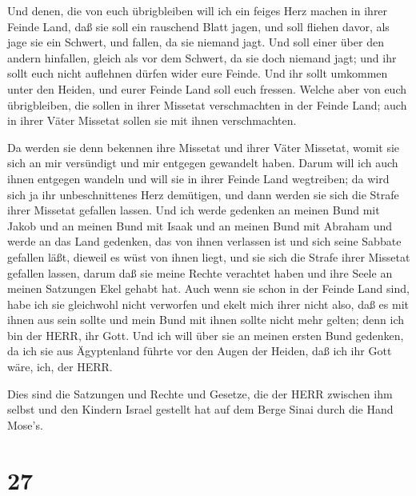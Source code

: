  Und denen, die von euch übrigbleiben will ich ein feiges
Herz machen in ihrer Feinde Land, daß sie soll ein rauschend Blatt
jagen, und soll fliehen davor, als jage sie ein Schwert, und fallen, da
sie niemand jagt.  Und soll einer über den andern
hinfallen, gleich als vor dem Schwert, da sie doch niemand jagt; und ihr
sollt euch nicht auflehnen dürfen wider eure Feinde.  Und
ihr sollt umkommen unter den Heiden, und eurer Feinde Land soll euch
fressen.  Welche aber von euch übrigbleiben, die sollen in
ihrer Missetat verschmachten in der Feinde Land; auch in ihrer Väter
Missetat sollen sie mit ihnen verschmachten.

 Da werden sie denn bekennen ihre Missetat und ihrer Väter
Missetat, womit sie sich an mir versündigt und mir entgegen gewandelt
haben.  Darum will ich auch ihnen entgegen wandeln und will
sie in ihrer Feinde Land wegtreiben; da wird sich ja ihr unbeschnittenes
Herz demütigen, und dann werden sie sich die Strafe ihrer Missetat
gefallen lassen.  Und ich werde gedenken an meinen Bund mit
Jakob und an meinen Bund mit Isaak und an meinen Bund mit Abraham und
werde an das Land gedenken,  das von ihnen verlassen ist
und sich seine Sabbate gefallen läßt, dieweil es wüst von ihnen liegt,
und sie sich die Strafe ihrer Missetat gefallen lassen, darum daß sie
meine Rechte verachtet haben und ihre Seele an meinen Satzungen Ekel
gehabt hat.  Auch wenn sie schon in der Feinde Land sind,
habe ich sie gleichwohl nicht verworfen und ekelt mich ihrer nicht also,
daß es mit ihnen aus sein sollte und mein Bund mit ihnen sollte nicht
mehr gelten; denn ich bin der HERR, ihr Gott.  Und ich will
über sie an meinen ersten Bund gedenken, da ich sie aus Ägyptenland
führte vor den Augen der Heiden, daß ich ihr Gott wäre, ich, der HERR.

 Dies sind die Satzungen und Rechte und Gesetze, die der
HERR zwischen ihm selbst und den Kindern Israel gestellt hat auf dem
Berge Sinai durch die Hand Mose's.

\hypertarget{section-26}{%
\section{27}\label{section-26}}

